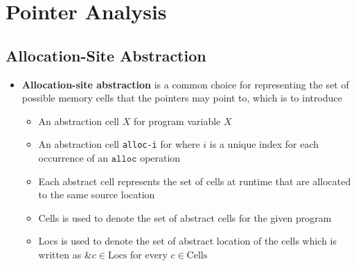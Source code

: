 \section{Pointer Analysis}
\subsection{Allocation-Site Abstraction}
\begin{itemize}
  \item \textbf{Allocation-site abstraction} is a common choice for representing the set of possible memory cells that the pointers may point to, which is to introduce
  \begin{itemize}
  	\item An abstraction cell $X$ for program variable $X$
  	\item An abstraction cell \texttt{alloc-i} for where $i$ is a unique index for each occurrence of an $\mathtt{alloc}$ operation
  	\item Each abstract cell represents the set of cells at runtime that are allocated to the same source location
  	\item Cells is used to denote the set of abstract cells for the given program
  	\item Locs is used to denote the set of abstract location of the cells which is written as $\& c \in \text{Locs}$ for every $c \in \text{Cells}$ 
  \end{itemize}
	
\end{itemize}

